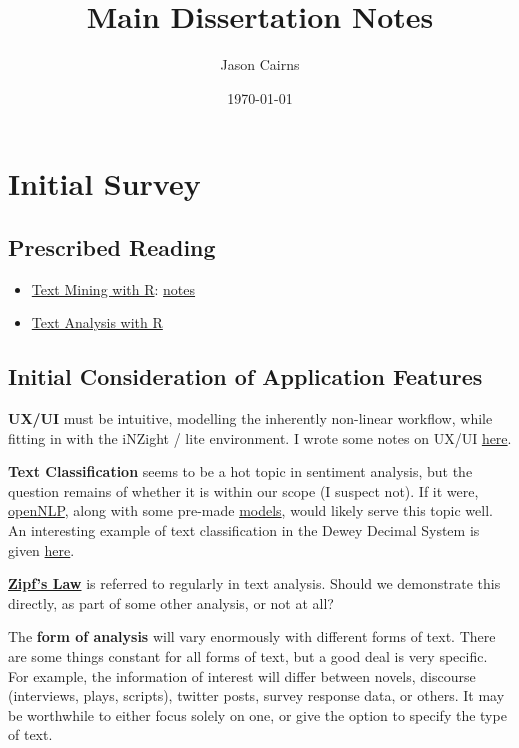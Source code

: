 \documentclass[a4paper, 11pt]{article}
\author{Jason Cairns}
\date{\today}
\title{Main Dissertation Notes}
\begin{document}
\maketitle
\tableofcontents


\section{Initial Survey}
\label{sec:org1c077a0}
\subsection{Prescribed Reading}
\label{sec:org3cd9e45}
\begin{itemize}
\item \href{https://www.tidytextmining.com}{Text Mining with R}: \href{./text\_mining\_with\_r.org}{notes}
\item \href{https://m-clark.github.io/text-analysis-with-R/}{Text Analysis with R}
\end{itemize}
\subsection{Initial Consideration of Application Features}
\label{sec:org4b6a812}
\textbf{UX/UI} must be intuitive, modelling the inherently non-linear workflow,
while fitting in with the iNZight / lite environment. I wrote some notes
on UX/UI \href{./ux\_ui.org}{here}.

\textbf{Text Classification} seems to be a hot topic in sentiment analysis, but
the question remains of whether it is within our scope (I suspect not).
If it were, \href{https://cran.r-project.org/web/packages/openNLP/}{openNLP}, along with some pre-made \href{https://datacube.wu.ac.at/src/contrib/}{models}, would likely serve 
this topic well. An interesting example of text classification in the
Dewey Decimal System is given \href{http://creatingdata.us/models/SRP-classifiers}{here}.

\textbf{\href{../reading/Thurner2015 - Understanding Zipfs Law of Word Frequencies through Sample Space Collapse in Sentence Formation.pdf}{Zipf's Law}} is referred to regularly in text analysis. Should we
demonstrate this directly, as part of some other analysis, or not at
all?

The \textbf{form of analysis} will vary enormously with different forms of
text. There are some things constant for all forms of text, but a good
deal is very specific. For example, the information of interest will
differ between novels, discourse (interviews, plays, scripts), twitter
posts, survey response data, or others. It may be worthwhile to either
focus solely on one, or give the option to specify the type of text.
\end{document}
